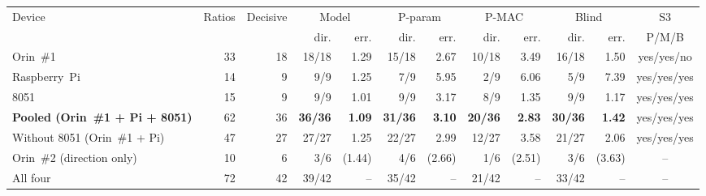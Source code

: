 \begin{tabular}{lrrrrrrrrrrc}
\toprule
Device & Ratios & Decisive & \multicolumn{2}{c}{Model} & \multicolumn{2}{c}{P-param} & \multicolumn{2}{c}{P-MAC} & \multicolumn{2}{c}{Blind} & S3 \\
\cmidrule(lr){4-5}\cmidrule(lr){6-7}\cmidrule(lr){8-9}\cmidrule(lr){10-11}
 & & & dir. & err. & dir. & err. & dir. & err. & dir. & err. & P/M/B \\
\midrule
Orin~\#1 & 33 & 18 & 18/18 & 1.29 & 15/18 & 2.67 & 10/18 & 3.49 & 16/18 & 1.50 & yes/yes/no \\
Raspberry~Pi & 14 & 9 & 9/9 & 1.25 & 7/9 & 5.95 & 2/9 & 6.06 & 5/9 & 7.39 & yes/yes/yes \\
8051 & 15 & 9 & 9/9 & 1.01 & 9/9 & 3.17 & 8/9 & 1.35 & 9/9 & 1.17 & yes/yes/yes \\
\midrule
\textbf{Pooled (Orin~\#1 + Pi + 8051)} & 62 & 36 & \textbf{36/36} & \textbf{1.09} & \textbf{31/36} & \textbf{3.10} & \textbf{20/36} & \textbf{2.83} & \textbf{30/36} & \textbf{1.42} & yes/yes/yes \\
Without 8051 (Orin~\#1 + Pi) & 47 & 27 & 27/27 & 1.25 & 22/27 & 2.99 & 12/27 & 3.58 & 21/27 & 2.06 & yes/yes/yes \\
\midrule
Orin~\#2 (direction only) & 10 & 6 & 3/6 & (1.44) & 4/6 & (2.66) & 1/6 & (2.51) & 3/6 & (3.63) & -- \\
All four & 72 & 42 & 39/42 & -- & 35/42 & -- & 21/42 & -- & 33/42 & -- & -- \\
\bottomrule
\end{tabular}
